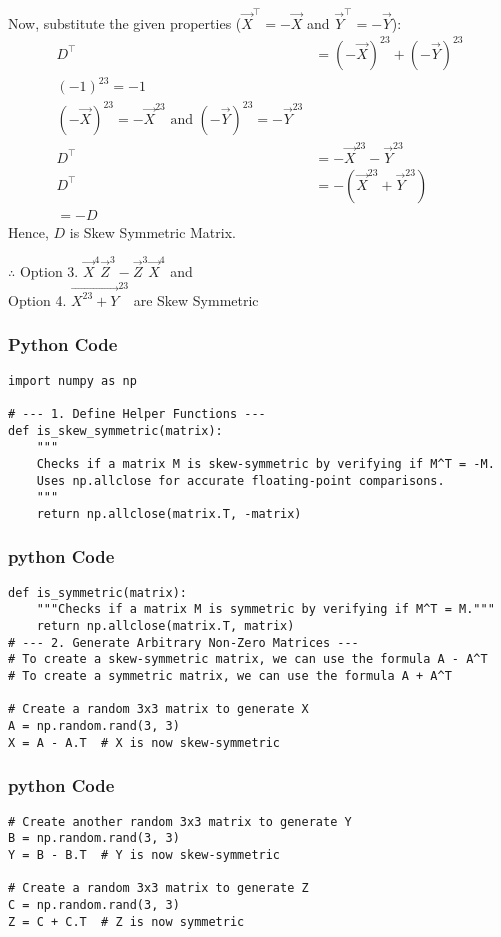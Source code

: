 \documentclass{beamer}
\begin{document}
\begin{frame}
Now, substitute the given properties ($\vec{X}^\top = -\vec{X}$ and $\vec{Y}^\top = -\vec{Y}$):
\begin{align}
D^\top &= (-\vec{X})^{23} + (-\vec{Y})^{23} \\
(-1)^{23} = -1\\
(-\vec{X})^{23} = -\vec{X}^{23} \text{ and } (-\vec{Y})^{23} = -\vec{Y}^{23}\\
D^\top &= -\vec{X}^{23} - \vec{Y}^{23} \\
D^\top &= -(\vec{X}^{23} + \vec{Y}^{23})\\
=-D
\end{align}
Hence, $D$ is Skew Symmetric Matrix.
\end{frame}
\begin{frame}
$\therefore$ Option 3. $\vec{X}^4\vec{Z}^3 - \vec{Z}^3\vec{X}^4$ and\\ 
Option 4. $\vec{X^{23} + Y}^{23}$ are Skew Symmetric
\end{frame}

\begin{frame}[fragile]
\frametitle{Python Code}
\begin{lstlisting}
import numpy as np

# --- 1. Define Helper Functions ---
def is_skew_symmetric(matrix):
    """
    Checks if a matrix M is skew-symmetric by verifying if M^T = -M.
    Uses np.allclose for accurate floating-point comparisons.
    """
    return np.allclose(matrix.T, -matrix)
\end{lstlisting}
\end{frame}

\begin{frame}[fragile]
\frametitle{python Code}
\begin{lstlisting}
def is_symmetric(matrix):
    """Checks if a matrix M is symmetric by verifying if M^T = M."""
    return np.allclose(matrix.T, matrix)
# --- 2. Generate Arbitrary Non-Zero Matrices ---
# To create a skew-symmetric matrix, we can use the formula A - A^T
# To create a symmetric matrix, we can use the formula A + A^T

# Create a random 3x3 matrix to generate X
A = np.random.rand(3, 3)
X = A - A.T  # X is now skew-symmetric
\end{lstlisting}
\end{frame}

\begin{frame}[fragile]
\frametitle{python Code}
\begin{lstlisting}
# Create another random 3x3 matrix to generate Y
B = np.random.rand(3, 3)
Y = B - B.T  # Y is now skew-symmetric

# Create a random 3x3 matrix to generate Z
C = np.random.rand(3, 3)
Z = C + C.T  # Z is now symmetric
\end{lstlisting}
\end{frame}
\end{document}
